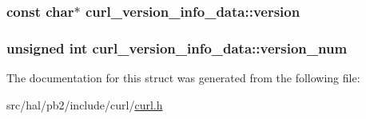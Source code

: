 \subsubsection[{\texorpdfstring{version}{version}}]{\setlength{\rightskip}{0pt plus 5cm}const char$\ast$ curl\+\_\+version\+\_\+info\+\_\+data\+::version}\hypertarget{structcurl__version__info__data_aaa34d7e958e6f35cde0a03380e12c201}{}\label{structcurl__version__info__data_aaa34d7e958e6f35cde0a03380e12c201}
\subsubsection[{\texorpdfstring{version\+\_\+num}{version_num}}]{\setlength{\rightskip}{0pt plus 5cm}unsigned int curl\+\_\+version\+\_\+info\+\_\+data\+::version\+\_\+num}\hypertarget{structcurl__version__info__data_a4afdf4d9449422e8741959683dd47985}{}\label{structcurl__version__info__data_a4afdf4d9449422e8741959683dd47985}


The documentation for this struct was generated from the following file\+:\begin{DoxyCompactItemize}
\item 
src/hal/pb2/include/curl/\hyperlink{curl_8h}{curl.\+h}\end{DoxyCompactItemize}
